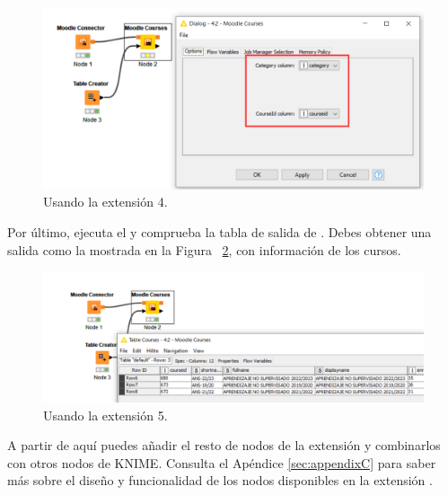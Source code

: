 \begin{figure}[!htb]
	\centering
	\includegraphics[width=1\textwidth]{img/manual_usuario_moodle_courses_config.png}
	\caption{Usando la extensión  4.}
	\label{fig:extension4}
\end{figure}
\FloatBarrier

Por último, ejecuta el  y comprueba la tabla de salida de . Debes obtener una 
salida como la mostrada en la Figura ~\ref{fig:extension5}, con información de los cursos.  

\begin{figure}[!htb]
	\centering
	\includegraphics[width=1\textwidth]{img/manual_usuario_moodle_courses_list.png}
	\caption{Usando la extensión  5.}
	\label{fig:extension5}
\end{figure}
\FloatBarrier

A partir de aquí puedes añadir el resto de nodos de la extensión y combinarlos con otros nodos de KNIME. 
Consulta el Apéndice \ref{sec:appendixC} para saber más sobre el diseño y funcionalidad de los nodos disponibles en la extensión . 
